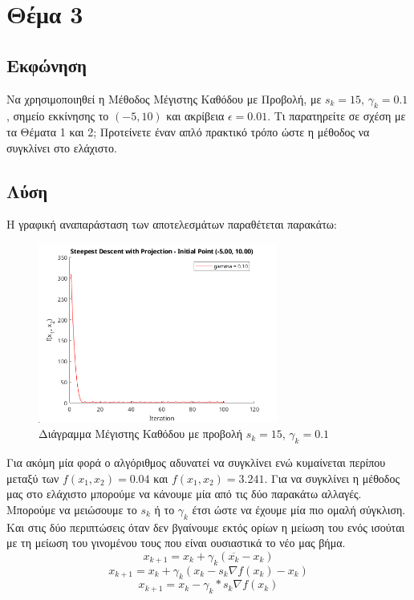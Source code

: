 \documentclass{report}
\begin{document}
\chapter{Θέμα 3}
\section{Εκφώνηση}
Να χρησιμοποιηθεί η Μέθοδος Μέγιστης Καθόδου με Προβολή, με $s_k = 15$, $\gamma_k = 0.1$,
σημείο εκκίνησης το $(-5,10)$ και ακρίβεια $\epsilon = 0.01$. Τι παρατηρείτε σε σχέση με τα Θέματα 1 
και 2; Προτείνετε έναν απλό πρακτικό τρόπο ώστε η 
μέθοδος να συγκλίνει στο ελάχιστο.

\section{Λύση}
Η γραφική αναπαράσταση των αποτελεσμάτων παραθέτεται παρακάτω:
\begin{figure}[H]
    \centering
    \includegraphics[width=0.7\textwidth]{media/thema3.png}
    \caption{Διάγραμμα Μέγιστης Καθόδου με προβολή $s_k = 15$, $\gamma_k = 0.1$}
\end{figure}
Για ακόμη μία φορά ο αλγόριθμος αδυνατεί να συγκλίνει ενώ κυμαίνεται περίπου μεταξύ των $f(x_1,x_2) = 0.04$ και
$f(x_1,x_2) = 3.241$. Για να συγκλίνει η μέθοδος μας στο ελάχιστο μπορούμε να κάνουμε μία από τις δύο παρακάτω
αλλαγές. Μπορούμε να μειώσουμε το $s_k$ ή το $\gamma_k$ έτσι ώστε να έχουμε μία πιο ομαλή σύγκλιση. Και στις δύο
περιπτώσεις όταν δεν βγαίνουμε εκτός ορίων η μείωση του ενός ισούται με τη μείωση του γινομένου τους που
είναι ουσιαστικά το νέο μας βήμα.
$$x_{k+1} = x_k + \gamma_k (\overline{x_k} - x_k)$$
$$x_{k+1} = x_k + \gamma_k (x_k - s_k \nabla f(x_k) - x_k)$$
$$x_{k+1} = x_k - \gamma_k * s_k \nabla f(x_k)$$
\end{document}

